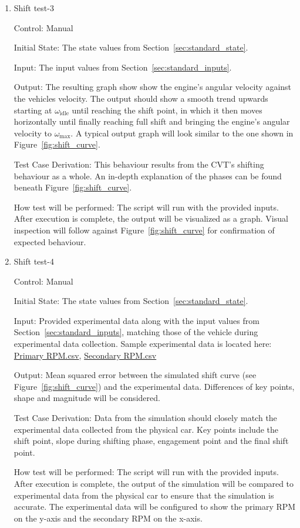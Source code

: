 \documentclass[12pt, titlepage]{article}
\begin{document}
\begin{enumerate}
  
  \item{Shift test-3\\}
  
  Control: Manual
            
  Initial State: The state values from Section~\ref{sec:standard_state}.
  
  Input: The input values from Section~\ref{sec:standard_inputs}.
            
  Output: The resulting graph show show the engine's angular velocity against the vehicles velocity. The output should show a smooth trend upwards starting at $\omega_\text{idle}$ until reaching the shift point, in which it then moves horizontally until finally reaching full shift and bringing the engine's angular velocity to $\omega_\text{max}$. A typical output graph will look similar to the one shown in Figure~\ref{fig:shift_curve}.
  
  Test Case Derivation: This behaviour results from the CVT's shifting behaviour as a whole. An in-depth explanation of the phases can be found beneath Figure~\ref{fig:shift_curve}.
  
  How test will be performed: The script will run with the provided inputs. After execution is complete, the output will be visualized as a graph. Visual inspection will follow against Figure~\ref{fig:shift_curve} for confirmation of expected behaviour.
  
  \item{Shift test-4\\}

  Control: Manual

  Initial State: The state values from Section~\ref{sec:standard_state}.

  Input: Provided experimental data along with the input values from Section~\ref{sec:standard_inputs}, matching those of the vehicle during experimental data collection. Sample experimental data is located here: \href{https://github.com/gr812b/CVT-Simulator/experimental-data/RPM%20PRIM.csv}{Primary RPM.csv}, \href{https://github.com/gr812b/CVT-Simulator/experimental-data/RPM%20SEC.csv}{Secondary RPM.csv} 

  Output: Mean squared error between the simulated shift curve (see Figure~\ref{fig:shift_curve}) and the experimental data. Differences of key points, shape and magnitude will be considered.

  Test Case Derivation: Data from the simulation should closely match the experimental data collected from the physical car. Key points include the shift point, slope during shifting phase, engagement point and the final shift point.

  How test will be performed: The script will run with the provided inputs. After execution is complete, the output of the simulation will be compared to experimental data from the physical car to ensure that the simulation is accurate. The experimental data will be configured to show the primary RPM on the y-axis and the secondary RPM on the x-axis.

\end{enumerate}
\end{document}

